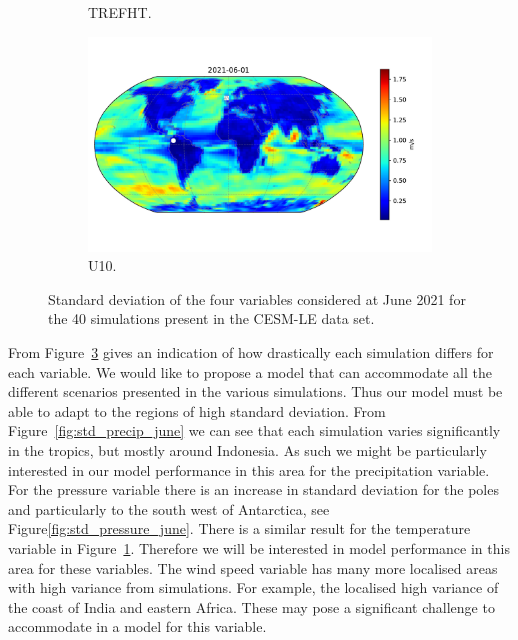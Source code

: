 \begin{figure}[htbp!]
\begin{subfigure}[b]{0.45\textwidth}
		\caption{TREFHT.}
		\label{fig:std_temp_june}   
	\end{subfigure}             
	\begin{subfigure}[b]{0.45\textwidth}
		\includegraphics[width=\textwidth]{U10_std}
		\caption{U10.}
		\label{fig:std_wind_june}
	\end{subfigure}             
	\caption[Overview of variability of Precipitation, Pressure, Temperature, and Wind speed.]{ Standard deviation of the four variables considered at June 2021 for the 40 simulations present in the CESM-LE data set.}
	\label{fig:std_overview}
\end{figure}

From Figure~\ref{fig:std_overview} gives an indication of how drastically each simulation differs for each variable.
We would like to propose a model that can accommodate all the different scenarios presented in the various simulations. 
Thus our model must be able to adapt to the regions of high standard deviation. 
From Figure~\ref{fig:std_precip_june} we can see that each simulation varies significantly in the tropics, but mostly around Indonesia.
As such we might be particularly interested in our model performance in this area for the precipitation variable.
For the pressure variable there is an increase in standard deviation for the poles and particularly to the south west of Antarctica, see Figure\ref{fig:std_pressure_june}.
There is a similar result for the temperature variable in Figure~\ref{fig:std_temp_june}.
Therefore we will be interested in model performance in this area for these variables.
The wind speed variable has many more localised areas with high variance from simulations.
For example, the localised high variance of the coast of India and eastern Africa.  
These may pose a significant challenge to accommodate in a model for this variable.


